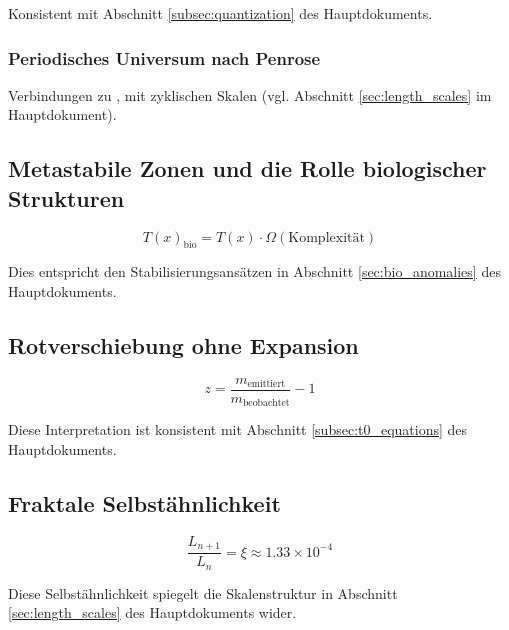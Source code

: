 \documentclass[12pt,a4paper]{article}
\newcommand{\Tfield}{T(x)}
\begin{document}
	Konsistent mit Abschnitt \ref{subsec:quantization} des Hauptdokuments.
	
	\subsubsection{Periodisches Universum nach Penrose}
	\label{subsubsec:penrose}
	
	Verbindungen zu \cite{penrose2010}, mit zyklischen Skalen (vgl. Abschnitt \ref{sec:length_scales} im Hauptdokument).
	
	\subsection{Metastabile Zonen und die Rolle biologischer Strukturen}
	\label{subsec:metastabile_zonen}
	
	\begin{equation}
		\label{eq:biostabilisierung}
		\Tfield_{\text{bio}} = \Tfield \cdot \Omega(\text{Komplexität})
	\end{equation}
	
	Dies entspricht den Stabilisierungsansätzen in Abschnitt \ref{sec:bio_anomalies} des Hauptdokuments.
	
	\subsection{Rotverschiebung ohne Expansion}
	\label{subsec:rotverschiebung}
	
	\begin{equation}
		\label{eq:rotverschiebung}
		z = \frac{m_{\text{emittiert}}}{m_{\text{beobachtet}}} - 1
	\end{equation}
	
	Diese Interpretation ist konsistent mit Abschnitt \ref{subsec:t0_equations} des Hauptdokuments.
	
	\subsection{Fraktale Selbstähnlichkeit}
	\label{subsec:fraktale_selbstaehnlichkeit}
	
	\begin{equation}
		\label{eq:selbstaehnlichkeit}
		\frac{L_{n+1}}{L_n} = \xi \approx 1.33 \times 10^{-4}
	\end{equation}
	
	Diese Selbstähnlichkeit spiegelt die Skalenstruktur in Abschnitt \ref{sec:length_scales} des Hauptdokuments wider.
	
\end{document}
